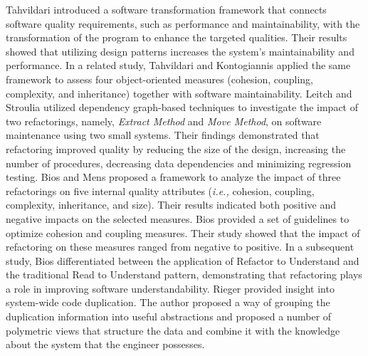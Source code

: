 Tahvildari \etal \citep{tahvildari2003quality} introduced a software transformation framework that connects software quality requirements, such as performance and maintainability, with the transformation of the program to enhance the targeted qualities. Their results showed that utilizing design patterns increases the system's maintainability and performance. In a related study, Tahvildari and Kontogiannis \citep{tahvildari2003metric} applied the same framework to assess four object-oriented measures (cohesion, coupling, complexity, and inheritance) together with software maintainability. Leitch and Stroulia \citep{leitch2003assessing} utilized dependency graph-based techniques to investigate the impact of two refactorings, namely, \textit{Extract Method} and \textit{Move Method}, on software maintenance using two small systems. Their findings demonstrated that refactoring improved quality by reducing the size of the design, increasing the number of procedures, decreasing data dependencies and minimizing regression testing. Bios and Mens \citep{du2003describing} proposed a framework to analyze the impact of three refactorings on five internal quality attributes (\textit{i.e.,} cohesion, coupling, complexity, inheritance, and size). Their results indicated both positive and negative impacts on the selected measures.  Bios \etal \citep{du2004refactoring} provided a set of guidelines to optimize cohesion and coupling measures. Their study showed that the impact of refactoring on these measures ranged from negative to positive. In a subsequent study,  Bios \etal \citep{du2005does} differentiated between the application of Refactor to Understand and the traditional Read to Understand pattern, demonstrating that refactoring plays a role in improving software understandability. Rieger \etal \citep{rieger2004insights} provided insight into system-wide code duplication. The author proposed a way of grouping the duplication information
into useful abstractions and proposed a number of
polymetric views that structure the data and combine it
with the knowledge about the system that the engineer possesses.

